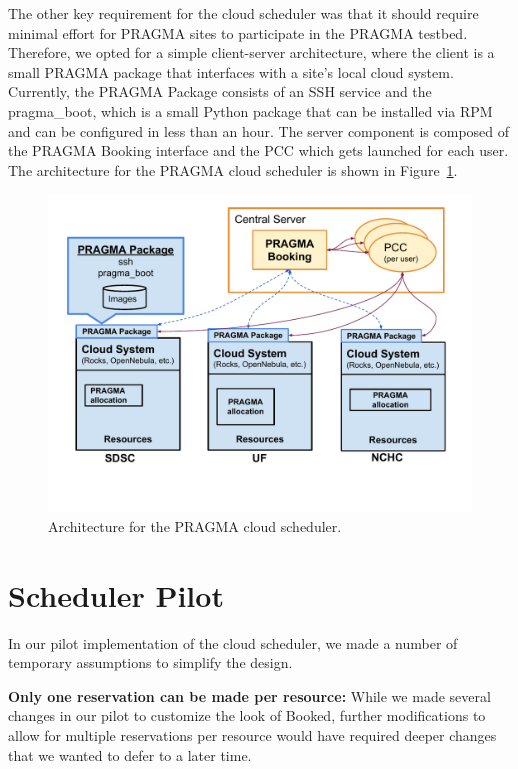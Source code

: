 \documentclass{acm_proc_article-sp}
\begin{document}
The other key requirement for the cloud scheduler was that it should require minimal effort for PRAGMA sites to participate in the PRAGMA testbed.  Therefore, we opted for a simple client-server architecture, where the client is a small PRAGMA package that interfaces with a site's local cloud system.  Currently, the PRAGMA Package consists of an SSH service and the pragma\_boot, which is a small Python package that can be installed via RPM and can be configured in less than an hour.  The server component is composed of the PRAGMA Booking interface and the PCC which gets launched for each user.  The architecture for the PRAGMA cloud scheduler is shown in Figure~\ref{Fig:Arch}.

\begin{figure}[htbp]
\begin{center}
\includegraphics[width=\columnwidth]{figures/arch.pdf}
\caption{Architecture for the PRAGMA cloud scheduler.}
\label{Fig:Arch}
\end{center}
\end{figure}

\section{Scheduler Pilot}
\label{Sec:Pilot}

In our pilot implementation of the cloud scheduler, we made a number of temporary assumptions to simplify the design.

\textbf{Only one reservation can be made per resource:}  While we made several changes in our pilot to customize the look of Booked, further modifications to allow for multiple reservations per resource would have required deeper changes that we wanted to defer to a later time.   
\end{document}
